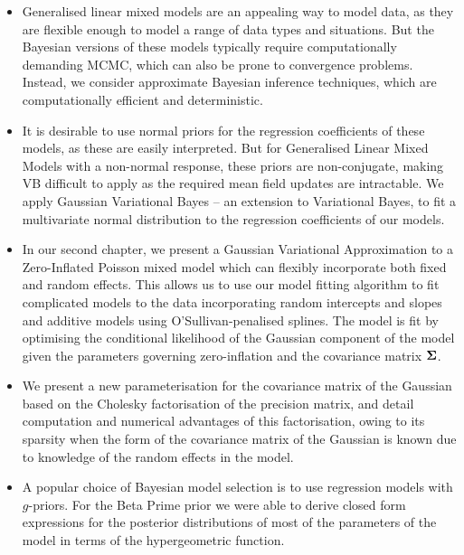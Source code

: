 \begin{itemize}
\item Generalised linear mixed models are an appealing way to model data, as they are flexible enough to model a
range of data types and situations. But the Bayesian versions of these models typically require
computationally demanding MCMC, which can also be prone to convergence problems. Instead, we consider approximate Bayesian inference techniques, which are computationally efficient and deterministic.
\item It is
desirable to use normal priors for the regression coefficients of these models, as these are easily
interpreted. But for Generalised Linear Mixed Models with a non-normal response, these priors are
non-conjugate, making VB difficult to apply as the required mean field updates are intractable. We apply
Gaussian Variational Bayes -- an extension to Variational Bayes, to fit a multivariate normal distribution
to the regression coefficients of our models.
\item In our second chapter, we present a Gaussian Variational Approximation to a Zero-Inflated Poisson mixed
model which can flexibly incorporate both fixed and random effects. This allows us to use our model fitting
algorithm to fit complicated models to the data incorporating random intercepts and
slopes and additive models using O'Sullivan-penalised splines.  The model is fit by optimising
the conditional likelihood of the Gaussian component of the model given the parameters
governing zero-inflation and the covariance matrix ${\boldsymbol \Sigma}$.
\item We present a new parameterisation for the covariance matrix of the Gaussian based on the Cholesky
factorisation of the precision matrix, and detail computation and numerical advantages of this
factorisation, owing to its sparsity when the form of the covariance matrix of the Gaussian is known due to
knowledge of the random effects in the model.


\item A popular choice of Bayesian model selection is to use regression models with $g$-priors. For the Beta
Prime prior \citep{Maruyama2011} we were able to derive closed form expressions for the posterior
distributions of most of the parameters of the model in terms of the hypergeometric function.


\end{itemize}
